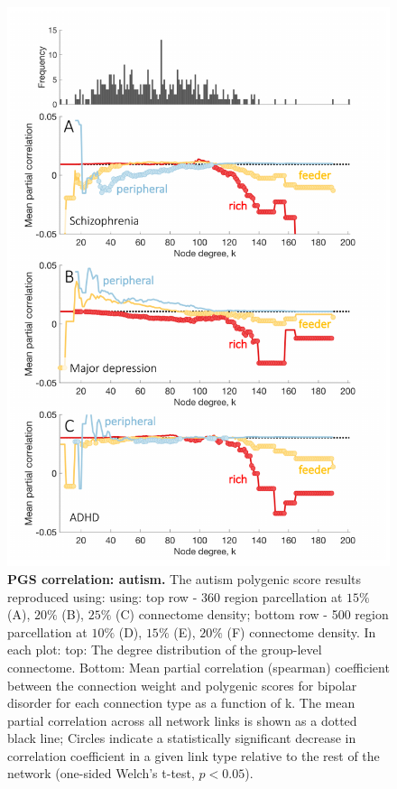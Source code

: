 \begin{figure}[h!]
\begin{center}
\includegraphics[width=1\textwidth]{Chapter5/SFigure6.pdf}%
\end{center}
\caption{\textbf{PGS correlation: autism.} 
The autism polygenic score results reproduced using: using: top row - 360 region parcellation at $15\%$ (A), $20\%$ (B), $25\%$ (C) connectome density; bottom row - 500 region parcellation at $10\%$ (D), $15\%$ (E), $20\%$ (F) connectome density. In each plot: top: The degree distribution of the group-level connectome. Bottom: Mean partial correlation (spearman) coefficient between the connection weight and polygenic scores for bipolar disorder for each connection type as a function of k. The mean partial correlation across all network links is shown as a dotted black line; Circles indicate a statistically significant decrease in correlation coefficient in a given link type relative to the rest of the network (one-sided Welch's t-test, $p < 0.05$).}
\label{fig:Ch5SFig6}
\end{figure}

